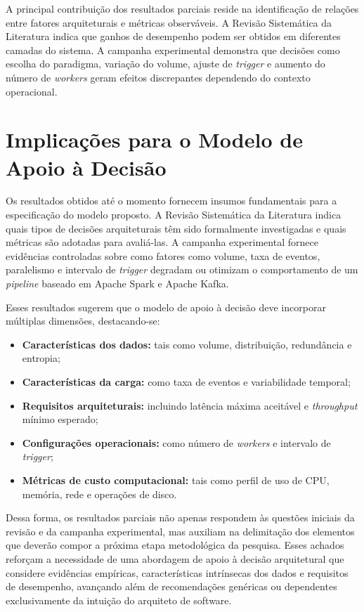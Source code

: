 A principal contribuição dos resultados parciais reside na identificação de relações entre fatores arquiteturais e métricas observáveis. A Revisão Sistemática da Literatura indica que ganhos de desempenho podem ser obtidos em diferentes camadas do sistema. A campanha experimental demonstra que decisões como escolha do paradigma, variação do volume, ajuste de \textit{trigger} e aumento do número de \textit{workers} geram efeitos discrepantes dependendo do contexto operacional.



\section{Implicações para o Modelo de Apoio à Decisão}
\label{sec:implicacoes-modelo}

Os resultados obtidos até o momento fornecem insumos fundamentais para a especificação do modelo proposto. A Revisão Sistemática da Literatura indica quais tipos de decisões arquiteturais têm sido formalmente investigadas e quais métricas são adotadas para avaliá-las. A campanha experimental fornece evidências controladas sobre como fatores como volume, taxa de eventos, paralelismo e intervalo de \textit{trigger} degradam ou otimizam o comportamento de um \textit{pipeline} baseado em Apache Spark e Apache Kafka.

Esses resultados sugerem que o modelo de apoio à decisão deve incorporar múltiplas dimensões, destacando-se:
\begin{itemize}
    \item \textbf{Características dos dados:} tais como volume, distribuição, redundância e entropia;
    \item \textbf{Características da carga:} como taxa de eventos e variabilidade temporal;
    \item \textbf{Requisitos arquiteturais:} incluindo latência máxima aceitável e \textit{throughput} mínimo esperado;
    \item \textbf{Configurações operacionais:} como número de \textit{workers} e intervalo de \textit{trigger};
    \item \textbf{Métricas de custo computacional:} tais como perfil de uso de CPU, memória, rede e operações de disco.
\end{itemize}

Dessa forma, os resultados parciais não apenas respondem às questões iniciais da revisão e da campanha experimental, mas auxiliam na delimitação dos elementos que deverão compor a próxima etapa metodológica da pesquisa. Esses achados reforçam a necessidade de uma abordagem de apoio à decisão arquitetural que considere evidências empíricas, características intrínsecas dos dados e requisitos de desempenho, avançando além de recomendações genéricas ou dependentes exclusivamente da intuição do arquiteto de software.
